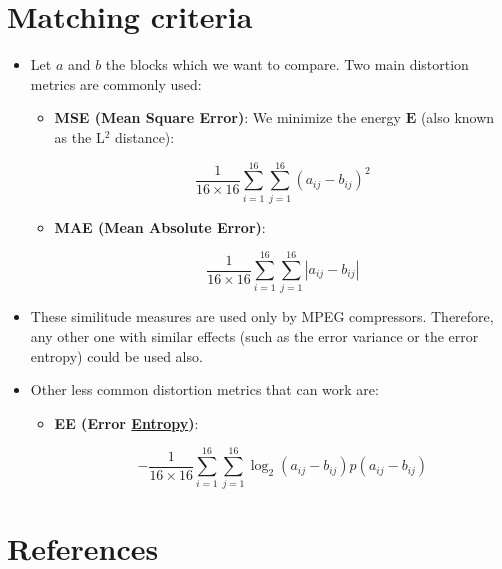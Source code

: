 
\section{Matching criteria}


\begin{itemize}
\item
  Let $a$ and $b$ the blocks which we want to compare. Two main
  distortion metrics are commonly used:

  \begin{itemize}
  \item
    \textbf{MSE (Mean Square Error)}: We minimize the energy ${\mathbf E}$ (also known as the L$^2$ distance):

    \begin{equation}
      \frac{1}{16\times 16}\sum_{i=1}^{16}\sum_{j=1}^{16}(a_{ij}-b_{ij})^2
    \end{equation}
  \item
    \textbf{MAE (Mean Absolute Error)}:

    \begin{equation}
      \frac{1}{16\times 16}\sum_{i=1}^{16}\sum_{j=1}^{16}|a_{ij}-b_{ij}|
    \end{equation}
  \end{itemize}
\item
  These similitude measures are used only by MPEG compressors.
  Therefore, any other one with similar effects (such as the error
  variance or the error entropy) could be used also.
\item
  Other less common distortion metrics that can work are:

  \begin{itemize}
  \item
    \textbf{EE (Error
    \href{https://en.wikipedia.org/wiki/Entropy_(information_theory)}{Entropy})}:

    \begin{equation}
      -\frac{1}{16\times 16}\sum_{i=1}^{16}\sum_{j=1}^{16}\log_2(a_{ij}-b_{ij})p(a_{ij}-b_{ij})
    \end{equation}
  \end{itemize}
\end{itemize}


\section{References}

\renewcommand{\addcontentsline}[3]{}%


